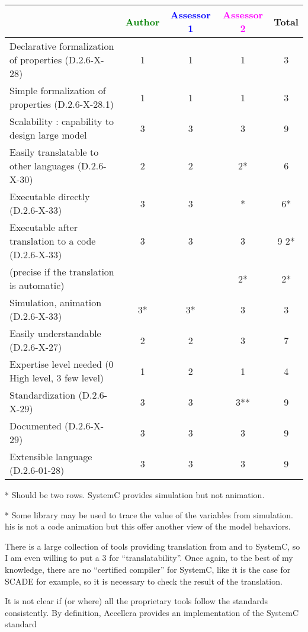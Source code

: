 \begin{tabular}{|l | c | c | c | c|}
  \hline
  & \textcolor{green}{Author} & \textcolor{blue}{Assessor 1} & \textcolor{magenta}{Assessor 2} & Total \\
  \hline
  Declarative formalization of properties (D.2.6-X-28) &1 &1 & 1& 3 \\
  \hline
  Simple formalization of properties (D.2.6-X-28.1) &1 &1 &1 & 3 \\
  \hline
  Scalability : capability to design large model &3 &3 & 3 & 9 \\
  \hline
  Easily translatable to other languages (D.2.6-X-30) & 2 & 2  & 2* & 6 \\
  \hline
  Executable directly (D.2.6-X-33) &3 & 3  & * & 6* \\
  \hline
  Executable after translation to a code (D.2.6-X-33) &3 &3 &3 & 9 2*\\
  (precise if the translation is automatic) & & & 2*& 2*\\
  \hline
  Simulation, animation (D.2.6-X-33) &3* &3* &3 & 3 \\
  \hline
  Easily understandable (D.2.6-X-27) &2 &2 &3 & 7 \\
  \hline
  Expertise level needed (0 High level, 3 few level) &1 &2 &1 & 4 \\
  \hline
  Standardization (D.2.6-X-29) &3 &3 &3** & 9 \\
  \hline
  Documented (D.2.6-X-29) &3 &3 &3 & 9 \\
  \hline
  Extensible language (D.2.6-01-28) &3 &3 &3 & 9 \\
  \hline
\end{tabular}

\begin{author_comment}
* Should be two rows. SystemC provides simulation but not animation.
\end{author_comment}
\begin{assessor1}
* Some library may be used to trace the value of  the variables from
simulation. his is not a code animation but this offer another view of
the model behaviors.
\end{assessor1}

\begin{assessor2}
\item[(*)] There is a large collection of tools providing translation
  from and to SystemC, so I am even willing to put a 3 for
  ``translatability''. Once again, to the best of my knowledge, there
  are no ``certified compiler'' for SystemC, like it is the case for
  SCADE for example, so it is necessary to check the result of the
  translation.
\item[(**)] It is not clear if (or where) all the proprietary tools
  follow the standards consistently. By definition, Accellera provides
  an implementation of the SystemC standard 
\end{assessor2}


